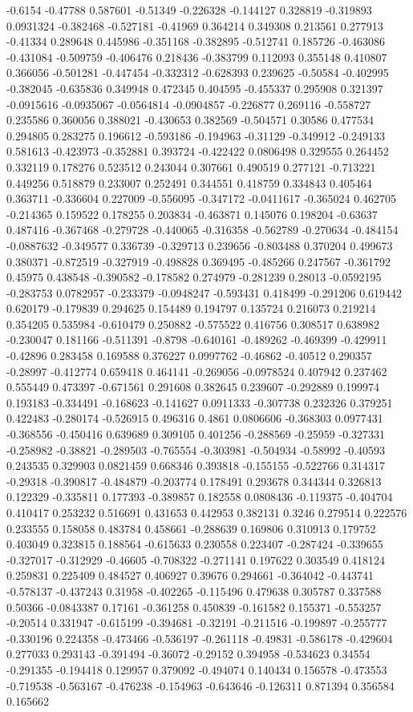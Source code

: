 -0.6154 -0.47788 0.587601 -0.51349 -0.226328 -0.144127 0.328819 -0.319893 0.0931324 -0.382468 -0.527181 -0.41969 0.364214 0.349308 0.213561 0.277913 -0.41334 0.289648 0.445986 -0.351168 -0.382895 -0.512741 0.185726 -0.463086 -0.431084 -0.509759 -0.406476 0.218436 -0.383799 0.112093 0.355148 0.410807 0.366056 -0.501281 -0.447454 -0.332312 -0.628393 0.239625 -0.50584 -0.402995 -0.382045 -0.635836 0.349948 0.472345 0.404595 -0.455337 0.295908 0.321397 -0.0915616 -0.0935067 -0.0564814 -0.0904857 -0.226877 0.269116 -0.558727 0.235586 0.360056 0.388021 -0.430653 0.382569 -0.504571 0.30586 0.477534 0.294805 0.283275 0.196612 -0.593186 -0.194963 -0.31129 -0.349912 -0.249133 0.581613 -0.423973 -0.352881 0.393724 -0.422422 0.0806498 0.329555 0.264452 0.332119 0.178276 0.523512 0.243044 0.307661 0.490519 0.277121 -0.713221 0.449256 0.518879 0.233007 0.252491 0.344551 0.418759 0.334843 0.405464 0.363711 -0.336604 0.227009 -0.556095 -0.347172 -0.0411617 -0.365024 0.462705 -0.214365 0.159522 0.178255 0.203834 -0.463871 0.145076 0.198204 -0.63637 0.487416 -0.367468 -0.279728 -0.440065 -0.316358 -0.562789 -0.270634 -0.484154 -0.0887632 -0.349577 0.336739 -0.329713 0.239656 -0.803488 0.370204 0.499673 0.380371 -0.872519 -0.327919 -0.498828 0.369495 -0.485266 0.247567 -0.361792 0.45975 0.438548 -0.390582 -0.178582 0.274979 -0.281239 0.28013 -0.0592195 -0.283753 0.0782957 -0.233379 -0.0948247 -0.593431 0.418499 -0.291206 0.619442 0.620179 -0.179839 0.294625 0.154489 0.194797 0.135724 0.216073 0.219214 0.354205 0.535984 -0.610479 0.250882 -0.575522 0.416756 0.308517 0.638982 -0.230047 0.181166 -0.511391 -0.8798 -0.640161 -0.489262 -0.469399 -0.429911 -0.42896 0.283458 0.169588 0.376227 0.0997762 -0.46862 -0.40512 0.290357 -0.28997 -0.412774 0.659418 0.464141 -0.269056 -0.0978524 0.407942 0.237462 0.555449 0.473397 -0.671561 0.291608 0.382645 0.239607 -0.292889 0.199974 0.193183 -0.334491 -0.168623 -0.141627 0.0911333 -0.307738 0.232326 0.379251 0.422483 -0.280174 -0.526915 0.496316 0.4861 0.0806606 -0.368303 0.0977431 -0.368556 -0.450416 0.639689 0.309105 0.401256 -0.288569 -0.25959 -0.327331 -0.258982 -0.38821 -0.289503 -0.765554 -0.303981 -0.504934 -0.58992 -0.40593 0.243535 0.329903 0.0821459 0.668346 0.393818 -0.155155 -0.522766 0.314317 -0.29318 -0.390817 -0.484879 -0.203774 0.178491 0.293678 0.344344 0.326813 0.122329 -0.335811 0.177393 -0.389857 0.182558 0.0808436 -0.119375 -0.404704 0.410417 0.253232 0.516691 0.431653 0.442953 0.382131 0.3246 0.279514 0.222576 0.233555 0.158058 0.483784 0.458661 -0.288639 0.169806 0.310913 0.179752 0.403049 0.323815 0.188564 -0.615633 0.230558 0.223407 -0.287424 -0.339655 -0.327017 -0.312929 -0.46605 -0.708322 -0.271141 0.197622 0.303549 0.418124 0.259831 0.225409 0.484527 0.406927 0.39676 0.294661 -0.364042 -0.443741 -0.578137 -0.437243 0.31958 -0.402265 -0.115496 0.479638 0.305787 0.337588 0.50366 -0.0843387 0.17161 -0.361258 0.450839 -0.161582 0.155371 -0.553257 -0.20514 0.331947 -0.615199 -0.394681 -0.32191 -0.211516 -0.199897 -0.255777 -0.330196 0.224358 -0.473466 -0.536197 -0.261118 -0.49831 -0.586178 -0.429604 0.277033 0.293143 -0.391494 -0.36072 -0.29152 0.394958 -0.534623 0.34554 -0.291355 -0.194418 0.129957 0.379092 -0.494074 0.140434 0.156578 -0.473553 -0.719538 -0.563167 -0.476238 -0.154963 -0.643646 -0.126311 0.871394 0.356584 0.165662 
